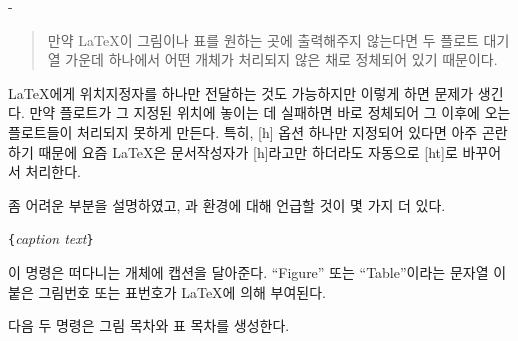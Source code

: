 \begin{adjustwidth}{0pt}{-\margheadwidth}
\begin{quote}
  만약 \LaTeX 이 그림이나 표를 원하는 곳에 출력해주지 않는다면
  두 플로트 대기열 가운데 하나에서 어떤 개체가 처리되지 않은 채로 정체되어 있기 때문이다.
\end{quote}


\LaTeX 에게 위치지정자를 하나만 전달하는 것도 가능하지만 이렇게 하면 문제가 생긴다.
만약 플로트가 그 지정된 위치에 놓이는 데 실패하면 바로 정체되어 그 이후에 오는 플로트들이
처리되지 못하게 만든다.
특히, [h] 옵션 하나만 지정되어 있다면 아주 곤란하기 때문에 요즘 \LaTeX 은 문서작성자가 
[h]라고만 하더라도 자동으로 [ht]로 바꾸어서 처리한다.

\bigskip
\noindent 좀 어려운 부분을 설명하였고, 과  환경에 대해 
언급할 것이 몇 가지 더 있다.

\begin{lscommand}
\verb|{|\emph{caption text}\verb|}|
\end{lscommand}
\noindent 이 명령은 떠다니는 개체에 캡션을 달아준다. ``Figure'' 또는 ``Table''이라는 
문자열%
이 붙은 그림번호 또는 표번호가 \LaTeX 에 의해 부여된다.

\bigskip

다음 두 명령은 그림 목차와 표 목차를 생성한다.

\begin{lscommand}
 
\end{lscommand}


\end{adjustwidth}
